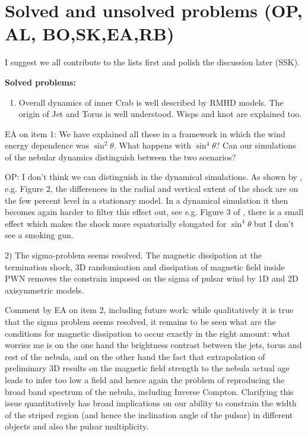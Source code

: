 \section{Solved and unsolved problems      (OP, AL, BO,SK,EA,RB)}
\label{sec:discussion}

I suggest we all contribute to the lists first and polish the discussion later (SSK). 

\textbf{Solved problems:}
\begin{enumerate}
\item Overall dynamics of inner Crab is well described by RMHD models. The origin of Jet and Torus is well understood. Wisps and knot are explained too.
\end{enumerate}

EA on item 1: We have explained all these in a framework in which the wind energy dependence was $\sin^2\theta$. What happens with $\sin^4\theta$? Can our simulations of the nebular dynamics distinguish between the two scenarios?

OP: I don't think we can distinguish in the dynamical simulations.  As shown by \cite{LyutikovKomissarov2016}, e.g. Figure 2, the differences in the radial and vertical extent of the shock are on the few percent level in a stationary model.  In a dynamical simulation it then becomes again harder to filter this effect out, see e.g. Figure 3 of \cite{BuhlerGiomi2016}, there is a small effect which makes the shock more equatorially elongated for $\sin^4\theta$ but I don't see a smoking gun.  

2) The sigma-problem seems resolved. The magnetic dissipation at the termination shock, 3D randomisation and dissipation of magnetic field inside PWN removes the constrain imposed on the sigma of pulsar wind by 1D and 2D axisymmetric models.

Comment by EA on item 2, including future work: while qualitatively it is true that the sigma problem seems resolved, it remains to be seen what are the conditions for magnetic dissipation to occur exactly in the right amount: what worries me is on the one hand the brightness contrast between the jets, torus and rest of the nebula, and on the other hand the fact that extrapolation of preliminary 3D results on the magnetic field strength to the nebula actual age leads to infer too low a field and hence again the problem of reproducing the broad band spectrum of the nebula, including Inverse Compton.
Clarifying this issue quantitatively has broad implications on our ability to constrain the width of the striped region (and hence the inclination angle of the pulsar) in different objects and also the pulsar multiplicity. 

